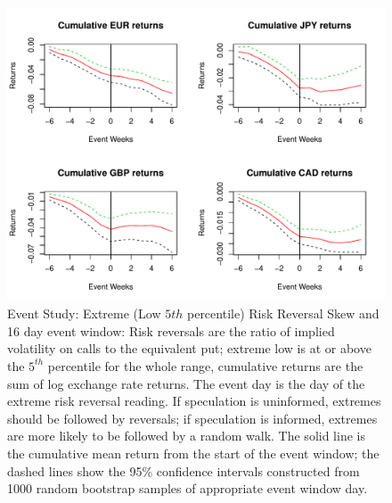 \documentclass{article}
\begin{document}
\begin{figure}
\graphicspath{{../Figures/}}
\centering
\includegraphics[scale=0.8]{FPCum6w}
\caption{Event Study: Extreme (Low $5{th}$ percentile) Risk Reversal Skew and 16 day event window: Risk reversals are the ratio of implied volatility on calls to the equivalent put; extreme low is at or above the $5^{th}$ percentile for the whole range, cumulative returns are the sum of log exchange rate returns. The event day is the day of the extreme risk reversal reading.  If speculation is uninformed, extremes should be followed by reversals; if speculation is informed, extremes are more likely to be followed by a random walk. The solid line is the cumulative mean return from the start of the event window; the dashed lines show the 95\% confidence intervals constructed from 1000 random bootstrap samples of appropriate event window day.}
\label{fig:ES3}
\end{figure}
\end{document}
